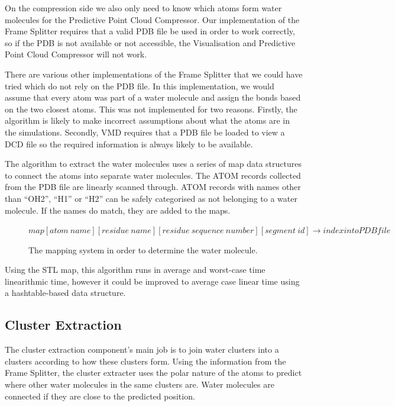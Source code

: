 \documentclass[a4paper,11pt]{report}
\begin{document}
On the compression side we also only need to  know which atoms form water molecules for the Predictive Point Cloud Compressor. Our implementation of the Frame Splitter requires that a valid PDB file be used in order to work correctly, so if the PDB is not available or not accessible, the Visualisation and Predictive Point Cloud Compressor will not work. 

There are various other implementations of the Frame Splitter that we could have tried which do not rely on the PDB file. In this implementation, we would assume that every atom was part of a water molecule and assign the bonds based on the two closest atoms. This was not implemented for two reasons. Firstly, the algorithm is likely to make incorrect assumptions about what the atoms are in the simulations. Secondly, VMD requires that a PDB file be loaded to view a DCD file so the required information is always likely to be available.

The algorithm to extract the water molecules uses a series of map data structures to connect the atoms into separate water molecules. The ATOM records collected from the PDB file are linearly scanned through. ATOM records with names other than ``OH2'', ``H1'' or ``H2'' can be safely categorised as not belonging to a water molecule. If the names do match, they are added to the maps.

\begin{figure}[!h]
\begin{center}
 \small
 $map[atom\ name][residue\ name][residue\ sequence\ number][segment\ id] \rightarrow index into PDB file$
 \caption{The mapping system in order to determine the water molecule.}
\end{center} 
\end{figure}

Using the STL map, this algorithm runs in average and worst-case time linearithmic time, however it could be improved to average case linear time using a hashtable-based data structure.

\subsection{Cluster Extraction}

The cluster extraction component's main job is to join water clusters into a clusters according to how these clusters form. Using the information from the Frame Splitter, the cluster extracter uses the polar nature of the atoms to predict where other water molecules in the same clusters are. Water molecules are connected if they are close to the predicted position.
\end{document}
